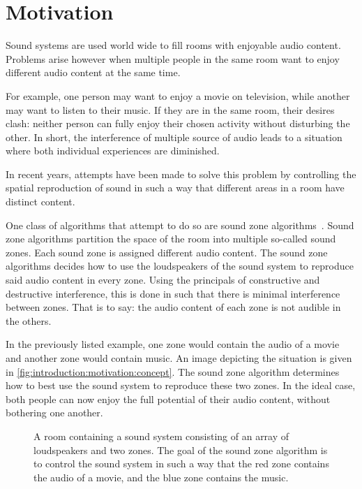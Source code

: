\section{Motivation}
\label{ch:introduction:motivation}
Sound systems are used world wide to fill rooms with enjoyable audio content. 
Problems arise however when multiple people in the same room want to enjoy different audio content at the same time.

For example, one person may want to enjoy a movie on television, while another may want to listen to their music.
If they are in the same room, their desires clash: neither person can fully enjoy their chosen activity without disturbing
the other.
In short, the interference of multiple source of audio leads to a situation where both individual experiences are diminished.

In recent years, attempts have been made to solve this problem by controlling the spatial reproduction of sound in such
a way that different areas in a room have distinct content.

One class of algorithms that attempt to do so are sound zone algorithms~\cite{betlehem2015personal}.
Sound zone algorithms partition the space of the room into multiple so-called sound zones.
Each sound zone is assigned different audio content.
The sound zone algorithms decides how to use the loudspeakers of the sound system to reproduce said audio content in every zone.
Using the principals of constructive and destructive interference, this is done in such that there is minimal interference between zones.
That is to say: the audio content of each zone is not audible in the others.

In the previously listed example, one zone would contain the audio of a movie and another zone would contain music.
An image depicting the situation is given in \autoref{fig:introduction:motivation:concept}.
The sound zone algorithm determines how to best use the sound system to reproduce these two zones.
In the ideal case, both people can now enjoy the full potential of their audio content, without bothering one another.

\begin{figure}[]
    \centering
    \scalebox{1.0}{}
    \caption{A room containing a sound system consisting of an array of loudspeakers and two zones.
                The goal of the sound zone algorithm is to control the sound system in such a way that the red zone
                contains the audio of a movie, and the blue zone contains the music.}
    \label{fig:introduction:motivation:concept}
\end{figure}

